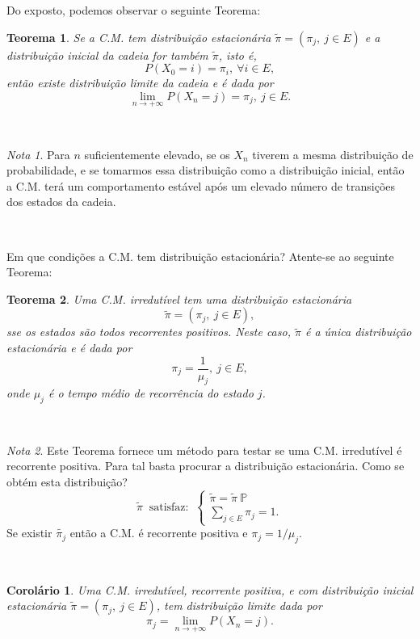 \documentclass[
  11pt,
  a4paper,
]{book}
\newtheorem{theorem}{Teorema}[chapter]
\newtheorem{corollary}{Corolário}[chapter]
\theoremstyle{definition}
\theoremstyle{definition}
\theoremstyle{definition}
\theoremstyle{definition}
\theoremstyle{remark}
\newtheorem*{remark}{Nota }
\begin{document}
Do exposto, podemos observar o seguinte Teorema:

\begin{theorem}
Se a C.M. tem distribuição estacionária \(\tilde{\pi}=(\pi_j, ~j \in E)\) e a distribuição inicial da cadeia for também \(\tilde{\pi}\), isto é,
\[P(X_0=i)=\pi_i, ~\forall i \in E,\]
então existe distribuição limite da cadeia e é dada por
\[\lim\limits_{n \to +\infty} P(X_n=j)=\pi_j, ~j \in E.\]
\end{theorem}

\(\,\)

\begin{remark}
Para \(n\) suficientemente elevado, se os \(X_n\) tiverem a mesma distribuição de probabilidade, e se tomarmos essa distribuição como a distribuição inicial, então a C.M. terá um comportamento estável após um elevado número de transições dos estados da cadeia.
\end{remark}

\(\,\)

Em que condições a C.M. tem distribuição estacionária? Atente-se ao seguinte Teorema:

\begin{theorem}
Uma C.M. irredutível tem uma distribuição estacionária
\[\tilde{\pi}=(\pi_j, ~j \in E),\]
sse os estados são todos recorrentes positivos. Neste caso, \(\tilde{\pi}\) é a única distribuição estacionária e é dada por
\[\pi_j=\dfrac{1}{\mu_j}, ~j \in E,\]
onde \(\mu_j\) é o tempo médio de recorrência do estado \(j\).
\end{theorem}

\(\,\)

\begin{remark}
Este Teorema fornece um método para testar se uma C.M. irredutível é recorrente positiva. Para tal basta procurar a distribuição estacionária. Como se obtém esta distribuição?
\[\tilde{\pi} ~ \text{  satisfaz:  } ~ \begin{cases}
\tilde{\pi} = \tilde{\pi} ~\mathbb{P}\\
\sum\limits_{j \in E} \pi_j=1.
\end{cases}\]
Se existir \(\tilde{\pi_j}\) então a C.M. é recorrente positiva e \(\pi_j=1/\mu_j\).
\end{remark}

\(\,\)

\begin{corollary}
Uma C.M. irredutível, recorrente positiva, e com distribuição inicial estacionária \(\tilde{\pi}=(\pi_j, ~j \in E)\), tem distribuição limite dada por
\[\pi_j=\lim\limits_{n \to +\infty} P(X_n=j).\]
\end{corollary}
\end{document}
